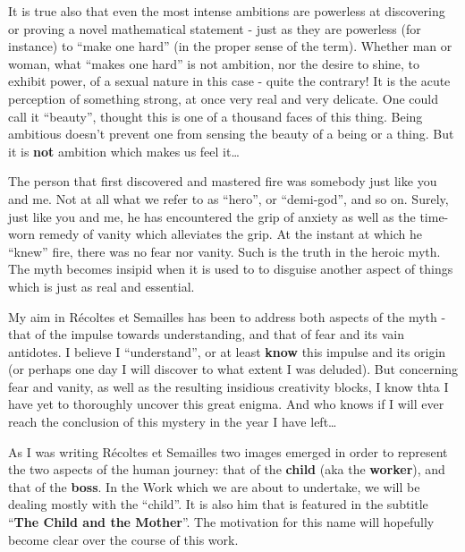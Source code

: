 It is true also that even the most intense ambitions are
powerless at discovering or proving a novel mathematical statement - just as they are
powerless (for instance) to ``make one hard'' (in the proper sense of the term).
Whether man or woman, what ``makes one hard'' is not ambition, nor the desire to shine, to
exhibit power, of a sexual nature in this case - quite the contrary!
It is the acute perception of something strong, at once very real and very delicate. 
One could call it ``beauty'', thought this is one of
a thousand faces of this thing. Being ambitious doesn't prevent one from 
sensing the beauty of a being or a thing. But it is \textbf{not} ambition which makes us
feel it\ldots 

The person that first discovered and mastered fire was somebody just like you and me. 
Not at all what we refer to as ``hero'', or ``demi-god'', and so on.  
Surely, just like you and me, he has encountered the grip of anxiety as well as the 
time-worn remedy of vanity which alleviates the grip.
At the instant at which he ``knew'' fire, there was no fear nor vanity. 
Such is the truth in the heroic myth. 
The myth becomes insipid when it is used to
to disguise another aspect of things which is just as real and essential. 

My aim in R\'ecoltes et Semailles has been to address both aspects of the myth - that of
the impulse towards understanding, and that of fear and its vain antidotes. 
I believe I ``understand'', or at least \textbf{know} this impulse and its origin (or
perhaps one day I will discover to what extent I was deluded). 
But concerning fear and vanity, as well as the resulting insidious creativity blocks, 
I know thta I have yet to thoroughly uncover this great enigma. 
And who knows if I will ever reach the conclusion of this mystery in the year I have
left\ldots

As I was writing 
R\'ecoltes et Semailles 
two images emerged in order to represent the two aspects of the human journey:
that of the \textbf{child} (aka the \textbf{worker}), and that of the
\textbf{boss}.
In the Work which we are about to undertake, we will be dealing mostly with the ``child''.
It is also him that is featured in the subtitle ``\textbf{The Child and the Mother}''. 
The motivation for this name 
will hopefully become clear over the course of this work.

